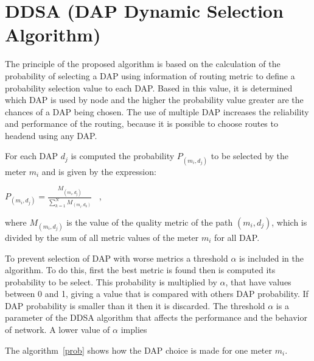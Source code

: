 \documentclass[conference]{IEEEtran}
\begin{document}
\section{DDSA (DAP Dynamic Selection Algorithm)}


The principle of the proposed algorithm is based on the calculation of the probability of selecting a DAP using information of routing metric to define a probability selection value to each DAP. Based in this value, it is determined which DAP is used by node and the higher the probability value greater are the chances of a DAP being chosen. The use of multiple DAP increases the reliability and performance of the routing, because it is possible to choose routes to headend using any DAP.

For each DAP $d_{j}$ is computed the probability $P_{(m_{i},d_{j})}$ to be selected by the meter $m_{i}$ and is 
given by the expression: \begin{center}$ P_{(m_{i},d_{j})} =  \frac {M_{(m_{i},d_{j})}}{\sum\limits_{k=1}^{N} M_{(m_{i},d_{k})}} $  \  , \end{center} where $ {M_{(m_{i},d_{j})}} $ is the value of the quality metric of the path $(m_{i},d_{j})$, which is divided by the sum of all metric values ​​of the meter $ m_ {i} $ for all DAP.

To prevent selection of DAP with worse metrics a threshold $\alpha$ is included in the algorithm. To do this, first the best metric is found then is computed its probability to be select. This probability is multiplied by $\alpha$, that have values between 0 and 1, giving a value that is compared with others DAP probability. If DAP probability is smaller than it then it is discarded. The threshold $\alpha$ is a parameter of the DDSA algorithm  that affects the performance and the behavior of network. A lower value of $\alpha$ implies  

The algorithm~\ref{prob} shows how the DAP choice is made for one meter $m_{i}$.
\end{document}
